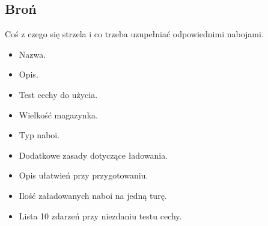 \subsection{Broń}
Coś z czego się strzela i co trzeba uzupełniać odpowiednimi nabojami.
\begin{itemize}
 \item Nazwa.
 \item Opis.
 \item Test cechy do użycia.
 \item Wielkość magazynka.
 \item Typ naboi.
 \item Dodatkowe zasady dotyczące ładowania.
 \item Opis ułatwień przy przygotowaniu.
 \item Ilość załadowanych naboi na jedną turę.
 \item Lista 10 zdarzeń przy niezdaniu testu cechy.
\end{itemize}











